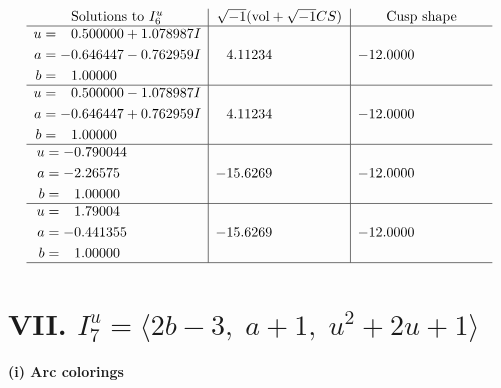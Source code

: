 \documentclass[1p]{elsarticle_modified}
\theoremstyle{definition}
\newcommand{\I}{\sqrt{-1}}
\begin{document}
$$\begin{array}{c|c|c}  
\text{Solutions to }I^u_{6}& \I (\text{vol} + \sqrt{-1}CS) & \text{Cusp shape}\\
 \hline 
\begin{aligned}
u &= \phantom{-}0.500000 + 1.078987 I \\
a &= -0.646447 - 0.762959 I \\
b &= \phantom{-}1.00000\phantom{ +0.000000I}\end{aligned}
 & \phantom{-}4.11234\phantom{ +0.000000I} & -12.0000\phantom{ +0.000000I} \\ \hline\begin{aligned}
u &= \phantom{-}0.500000 - 1.078987 I \\
a &= -0.646447 + 0.762959 I \\
b &= \phantom{-}1.00000\phantom{ +0.000000I}\end{aligned}
 & \phantom{-}4.11234\phantom{ +0.000000I} & -12.0000\phantom{ +0.000000I} \\ \hline\begin{aligned}
u &= -0.790044\phantom{ +0.000000I} \\
a &= -2.26575\phantom{ +0.000000I} \\
b &= \phantom{-}1.00000\phantom{ +0.000000I}\end{aligned}
 & -15.6269\phantom{ +0.000000I} & -12.0000\phantom{ +0.000000I} \\ \hline\begin{aligned}
u &= \phantom{-}1.79004\phantom{ +0.000000I} \\
a &= -0.441355\phantom{ +0.000000I} \\
b &= \phantom{-}1.00000\phantom{ +0.000000I}\end{aligned}
 & -15.6269\phantom{ +0.000000I} & -12.0000\phantom{ +0.000000I}\\
 \hline 
 \end{array}$$\newpage\newpage\renewcommand{\arraystretch}{1}
\centering \section*{VII. $I^u_{7}= \langle 2 b-3,\;a+1,\;u^2+2 u+1 \rangle$}
\flushleft \textbf{(i) Arc colorings}\\
\end{document}
